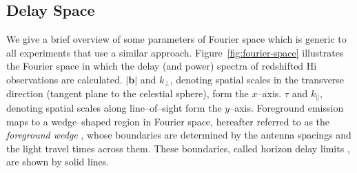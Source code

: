 \documentclass[preprint2,iop,numberedappendix,twocolappendix,appendixfloats]{emulateapj}
\begin{document}
\subsection{Delay Space}\label{sec:delay-space}

We give a brief overview of some parameters of Fourier space which is generic to all experiments that use a similar approach. Figure~\ref{fig:fourier-space} illustrates the Fourier space in which the delay (and power) spectra of redshifted H{\sc i} observations are calculated. $|\boldsymbol{b}|$ and $k_\perp$, denoting spatial scales in the transverse direction (tangent plane to the celestial sphere), form the $x$--axis. $\tau$ and $k_\parallel$, denoting spatial scales along line--of--sight form the $y$--axis. Foreground emission maps to a wedge--shaped region in Fourier space, hereafter referred to as the {\it foreground wedge} \citep{dat10}, whose boundaries are determined by the antenna spacings and the light travel times across them. These boundaries, called horizon delay limits \citep{ved12,par12b}, are shown by solid lines. 
\end{document}

